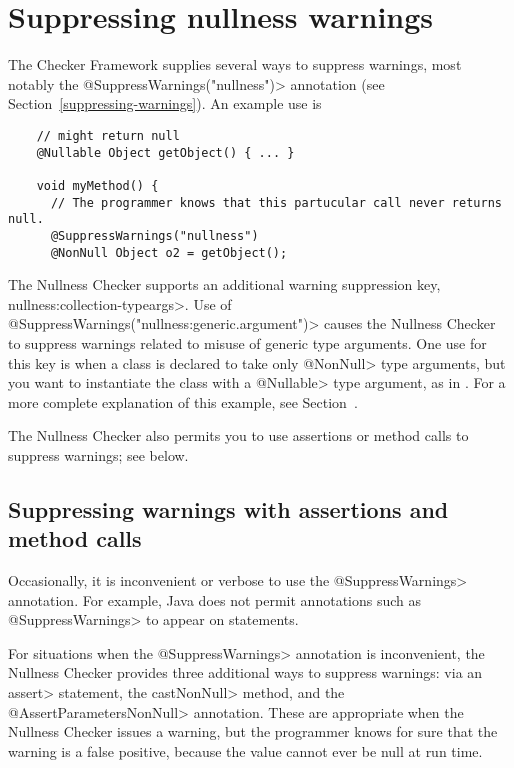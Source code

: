 \section{Suppressing nullness warnings\label{suppressing-warnings-nullness}}

The Checker Framework supplies several ways to suppress warnings, most
notably the \<@SuppressWarnings("nullness")> annotation (see
Section~\ref{suppressing-warnings}).  An example use is

\begin{Verbatim}
    // might return null
    @Nullable Object getObject() { ... }

    void myMethod() {
      // The programmer knows that this partucular call never returns null.
      @SuppressWarnings("nullness")
      @NonNull Object o2 = getObject();
\end{Verbatim}


The Nullness Checker supports an additional warning suppression key,
\<nullness:collection-typeargs>.
Use of \<@SuppressWarnings("nullness:generic.argument")> causes the Nullness
Checker to suppress warnings related to misuse of generic type
arguments.  One use for this key is when a class is declared to take only
\<@NonNull> type arguments, but you want to instantiate the class with a
\<@Nullable> type argument, as in .  For a more
complete explanation of this example, see
Section~.

The Nullness Checker also permits you to use assertions or method calls to
suppress warnings; see below.



\subsection{Suppressing warnings with assertions and method calls\label{suppressing-warnings-with-assertions}}

Occasionally, it is inconvenient or
verbose to use the \<@SuppressWarnings> annotation.  For example, Java does
not permit annotations such as \<@SuppressWarnings> to appear on statements.

For situations when the \<@SuppressWarnings> annotation is inconvenient,
the Nullness Checker provides three additional ways to suppress warnings:
via an \<assert> statement, the \<castNonNull> method, and the
\<@AssertParametersNonNull> annotation.  These are
appropriate when the Nullness Checker issues a warning, but the programmer
knows for sure that the warning is a false positive, because the value
cannot ever be null at run time.

